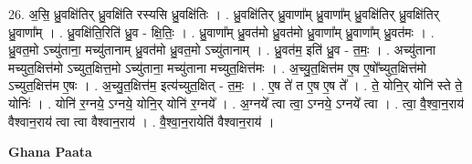\documentclass[17pt]{extarticle}
\begin{document}
26. अ॒सि॒ ध्रु॒वक्षि॑तिर् ध्रु॒वक्षि॑ति रस्यसि ध्रु॒वक्षि॑तिः । . ध्रु॒वक्षि॑तिर् ध्रु॒वाणा᳚म् ध्रु॒वाणा᳚म् ध्रु॒वक्षि॑तिर् ध्रु॒वक्षि॑तिर् ध्रु॒वाणा᳚म् । . ध्रु॒वक्षि॑ति॒रिति॑ ध्रु॒व - क्षि॒तिः॒ । . ध्रु॒वाणा᳚म् ध्रु॒वत॑मो ध्रु॒वत॑मो ध्रु॒वाणा᳚म् ध्रु॒वाणा᳚म् ध्रु॒वत॑मः । . ध्रु॒वत॒मो ऽच्यु॑ताना॒ मच्यु॑तानाम् ध्रु॒वत॑मो ध्रु॒वत॒मो ऽच्यु॑तानाम् । . ध्रु॒वत॑म॒ इति॑ ध्रु॒व - त॒मः॒ । . अच्यु॑ताना मच्युत॒क्षित्त॑मो ऽच्युत॒क्षित्त॒मो ऽच्यु॑ताना॒ मच्यु॑ताना मच्युत॒क्षित्त॑मः । . अ॒च्यु॒त॒क्षित्त॑म ए॒ष ए॒षो᳚च्युत॒क्षित्त॑मो ऽच्युत॒क्षित्त॑म ए॒षः । . अ॒च्यु॒त॒क्षित्त॑म॒ इत्य॑च्युत॒क्षित् - त॒मः॒ । . ए॒ष ते॑ त ए॒ष ए॒ष ते᳚ । . ते॒ योनि॒र् योनि॑ स्ते ते॒ योनिः॑ । . योनि॑ र॒ग्नये॒ ऽग्नये॒ योनि॒र् योनि॑ र॒ग्नये᳚ । . अ॒ग्नये᳚ त्वा त्वा॒ ऽग्नये॒ ऽग्नये᳚ त्वा । . त्वा॒ वै॒श्वा॒न॒राय॑ वैश्वान॒राय॑ त्वा त्वा वैश्वान॒राय॑ । . वै॒श्वा॒न॒रायेति॑ वैश्वान॒राय॑ । \newline

\textbf{Ghana Paata } \newline
\end{document}
